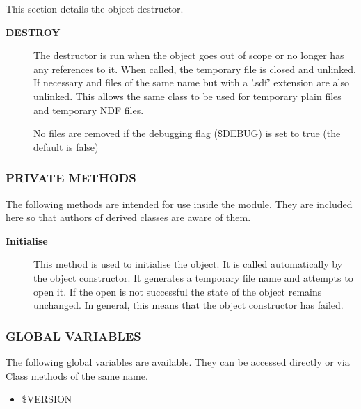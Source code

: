 \begin{description}
This section details the object destructor.

\begin{description}

\item[{\textbf{DESTROY}}] \mbox{}

The destructor is run when the object goes out of scope
or no longer has any references to it. When called, the
temporary file is closed and unlinked. If necessary
and files of the same name but with a '.sdf' extension
are also unlinked. This allows the same class to be used
for temporary plain files and temporary NDF files.



No files are removed if the debugging flag (\$DEBUG) is set to
true (the default is false)

\end{description}
\subsubsection*{PRIVATE METHODS\label{ORAC::TempFile_PRIVATE_METHODS}}


The following methods are intended for use inside the module.
They are included here so that authors of derived classes are 
aware of them.

\begin{description}

\item[{\textbf{Initialise}}] \mbox{}

This method is used to initialise the object. It is called
automatically by the object constructor. It generates
a temporary file name and attempts to open it. If the 
open is not successful the state of the object remains 
unchanged. In general, this means that the object
constructor has failed.

\end{description}
\subsubsection*{GLOBAL VARIABLES\label{ORAC::TempFile_GLOBAL_VARIABLES}}


The following global variables are available.
They can be accessed directly or via Class methods of the same name.

\begin{itemize}

\item \$VERSION


\end{itemize}
\end{description}
